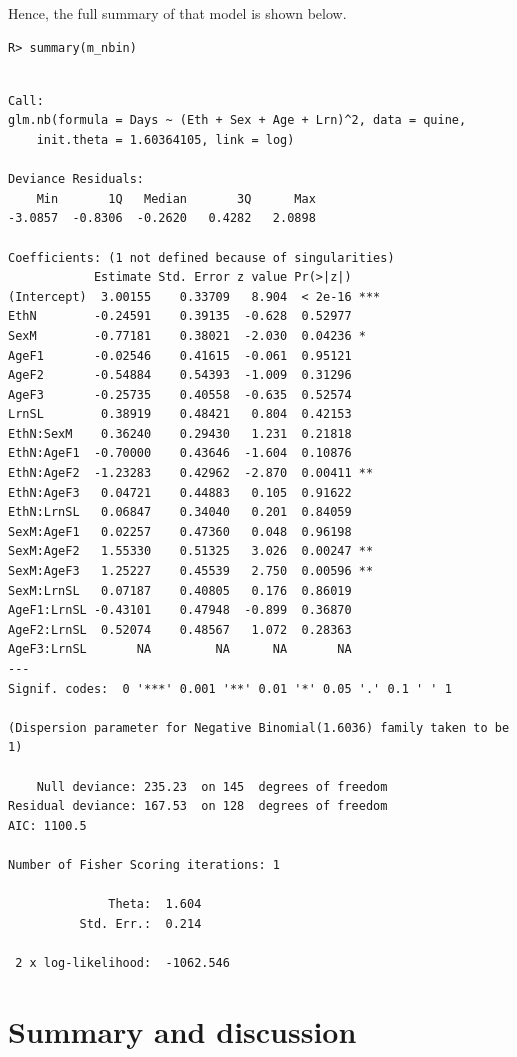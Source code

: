 \documentclass[
  article]{jss}
\begin{document}
Hence, the full summary of that model is shown below.

\begin{verbatim}
R> summary(m_nbin)
\end{verbatim}

\begin{verbatim}

Call:
glm.nb(formula = Days ~ (Eth + Sex + Age + Lrn)^2, data = quine, 
    init.theta = 1.60364105, link = log)

Deviance Residuals: 
    Min       1Q   Median       3Q      Max  
-3.0857  -0.8306  -0.2620   0.4282   2.0898  

Coefficients: (1 not defined because of singularities)
            Estimate Std. Error z value Pr(>|z|)    
(Intercept)  3.00155    0.33709   8.904  < 2e-16 ***
EthN        -0.24591    0.39135  -0.628  0.52977    
SexM        -0.77181    0.38021  -2.030  0.04236 *  
AgeF1       -0.02546    0.41615  -0.061  0.95121    
AgeF2       -0.54884    0.54393  -1.009  0.31296    
AgeF3       -0.25735    0.40558  -0.635  0.52574    
LrnSL        0.38919    0.48421   0.804  0.42153    
EthN:SexM    0.36240    0.29430   1.231  0.21818    
EthN:AgeF1  -0.70000    0.43646  -1.604  0.10876    
EthN:AgeF2  -1.23283    0.42962  -2.870  0.00411 ** 
EthN:AgeF3   0.04721    0.44883   0.105  0.91622    
EthN:LrnSL   0.06847    0.34040   0.201  0.84059    
SexM:AgeF1   0.02257    0.47360   0.048  0.96198    
SexM:AgeF2   1.55330    0.51325   3.026  0.00247 ** 
SexM:AgeF3   1.25227    0.45539   2.750  0.00596 ** 
SexM:LrnSL   0.07187    0.40805   0.176  0.86019    
AgeF1:LrnSL -0.43101    0.47948  -0.899  0.36870    
AgeF2:LrnSL  0.52074    0.48567   1.072  0.28363    
AgeF3:LrnSL       NA         NA      NA       NA    
---
Signif. codes:  0 '***' 0.001 '**' 0.01 '*' 0.05 '.' 0.1 ' ' 1

(Dispersion parameter for Negative Binomial(1.6036) family taken to be 1)

    Null deviance: 235.23  on 145  degrees of freedom
Residual deviance: 167.53  on 128  degrees of freedom
AIC: 1100.5

Number of Fisher Scoring iterations: 1

              Theta:  1.604 
          Std. Err.:  0.214 

 2 x log-likelihood:  -1062.546 
\end{verbatim}

\hypertarget{sec-summary}{%
\section{Summary and discussion}\label{sec-summary}}
\end{document}
